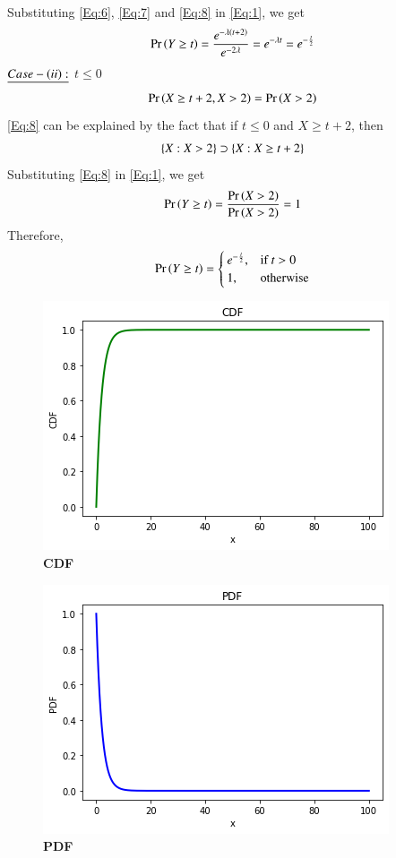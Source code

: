 \documentclass[journal,12pt,twocolumn]{IEEEtran}
\begin{document}
Substituting \eqref{Eq:6}, \eqref{Eq:7} and \eqref{Eq:8} in \eqref{Eq:1}, we get
\begin{align}
\Pr\left(Y \geq t\right) = \frac{e^{-\lambda \left(t+2\right)}}{e^{-2\lambda}} = e^{-\lambda t} = e^{-\frac{t}{2}}
\end{align}
$\underline{Case-\left(ii\right):}$ $t \leq 0$
\begin{align}
\Pr\left(X \geq t+2,X>2\right) = \Pr\left(X>2\right) \label{Eq:8}
\end{align}
\eqref{Eq:8} can be explained by the fact that if $t\leq 0$ and $X \geq t+2$, then 
\begin{align}
\{X:X>2\} \supset \{X:X\geq t+2\} \notag
\end{align}
Substituting \eqref{Eq:8} in \eqref{Eq:1}, we get
\begin{align}
\Pr\left(Y \geq t\right) = \frac{\Pr\left(X>2\right)}{\Pr\left(X>2\right)} = 1
\end{align}
Therefore, 
\begin{align}
 \Pr\left(Y \geq t\right) =  \begin{cases}
			e^{-\frac{t}{2}}, & \text{if $t>0$}\\
            1, & \text{otherwise}
		 \end{cases} 
\end{align}
\newpage
\begin{figure}
\includegraphics[width=\columnwidth]{figure_1.png}
    \caption{\textbf{\huge{CDF}}} 
\end{figure}
\begin{figure}
\includegraphics[width=\columnwidth]{figure_2.png}
    \caption{\textbf{\huge{PDF}}}
\end{figure}
\end{document}
